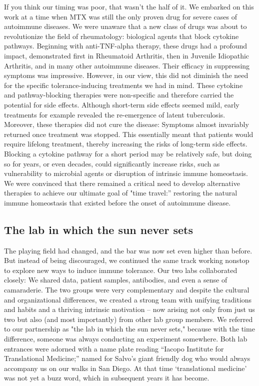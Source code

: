 \documentclass[authordate, editorial]{jote-new-article}
\begin{document}
	If you think our timing was poor, that wasn't the half of it. We embarked on this work at a time when MTX was still the only proven drug for severe cases of autoimmune diseases. We were unaware that a new class of drugs was about to revolutionize the field of rheumatology: biological agents that block cytokine pathways. Beginning with anti-TNF-alpha therapy, these drugs had a profound impact, demonstrated first in Rheumatoid Arthritis, then in Juvenile Idiopathic Arthritis, and in many other autoimmune diseases. Their efficacy in suppressing symptoms was impressive. However, in our view, this did not diminish the need for the specific tolerance-inducing treatments we had in mind. These cytokine and pathway-blocking therapies were non-specific and therefore carried the potential for side effects. Although short-term side effects seemed mild, early treatments for example revealed the re-emergence of latent tuberculosis. Moreover, these therapies did not cure the disease: Symptoms almost invariably returned once treatment was stopped. This essentially meant that patients would require lifelong treatment, thereby increasing the risks of long-term side effects. Blocking a cytokine pathway for a short period may be relatively safe, but doing so for years, or even decades, could significantly increase risks, such as vulnerability to microbial agents or disruption of intrinsic immune homeostasis. We were convinced that there remained a critical need to develop alternative therapies to achieve our ultimate goal of "time travel:” restoring the natural immune homeostasis that existed before the onset of autoimmune disease.







	\subsection{The lab in which the sun never sets}



	The playing field had changed, and the bar was now set even higher than before. But instead of being discouraged, we continued the same track working nonstop to explore new ways to induce immune tolerance. Our two labs collaborated closely: We shared data, patient samples, antibodies, and even a sense of camaraderie. The two groups were very complementary and despite the cultural and organizational differences, we created a strong team with unifying traditions and habits and a thriving intrinsic motivation -- now arising not only from just us two but also (and most importantly) from other lab group members. We referred to our partnership as "the lab in which the sun never sets," because with the time difference, someone was always conducting an experiment somewhere. Both lab entrances were adorned with a name plate reading “Iacopo Institute for Translational Medicine;” named for Salvo's giant friendly dog who would always accompany us on our walks in San Diego. At that time ‘translational medicine' was not yet a buzz word, which in subsequent years it has become.
\end{document}
